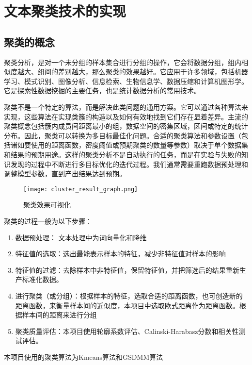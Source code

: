 \section{文本聚类技术的实现}

\subsection{聚类的概念}
聚类分析，是对一个未分组的样本集合进行分组的操作，它会将数据分组，组内相似度越大、组间的差别越大，那么聚类的效果越好。它应用于许多领域，包括机器学习、模式识别、图像分析、信息检索、生物信息学、数据压缩和计算机图形学。它是探索性数据挖掘的主要任务，也是统计数据分析的常用技术。

聚类不是一个特定的算法，而是解决此类问题的通用方案。它可以通过各种算法来实现，这些算法在实现类簇的构造以及如何有效地找到它们存在显着差异。主流的聚类概念包括簇内成员间距离最小的组，数据空间的密集区域，区间或特定的统计分布。因此，聚类可以转换为多目标最佳化问题。合适的聚类算法和参数设置（包括诸如要使用的距离函数，密度阈值或预期聚类的数量等参数）取决于单个数据集和结果的预期用途。这样的聚类分析不是自动执行的任务，而是在实验与失败的知识发现的过程中不断进行多目标优化的迭代过程。我们通常需要重跑数据预处理和调整模型参数，直到产出结果达到预期。

\begin{figure}[H]
	\begin{center}
		\texttt{[image: cluster\_result\_graph.png]}
	\end{center}
	\caption{聚类效果可视化}
	\label{word_vec:example}
\end{figure}

聚类的过程一般为以下步骤： \cite{DBLP:journals/csur/JainMF99,DBLP:journals/pami/JainDM00}
\begin{enumerate}
	\item 数据预处理： 文本处理中为词向量化和降维
	\item 特征值的选取：选出最能表示样本的特征，减少非特征值对样本的影响
	\item 特征值的过滤：去除样本中非特征值，保留特征值，并把筛选后的结果重新生产标准化数据。
	\item 进行聚类（或分组）：根据样本的特征，选取合适的距离函数，也可创造新的距离函数，来衡量样本间的近似度，本项目中选取欧式距离作为距离函数。根据样本间的距离来进行分组
	\item 聚类质量评估：本项目使用轮廓系数评估、Calinski-Harabasz分数和相关性测试评估。
\end{enumerate}

本项目使用的聚类算法为Kmeans算法和GSDMM算法

